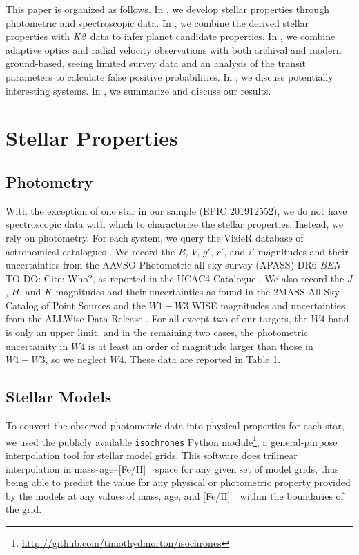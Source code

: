 \documentclass{emulateapj}
\newcommand{\project}[1]{\textsl{#1}}
\newcommand{\KT}{\project{K2}}
\newcommand{\feh}{{[Fe/H]}~}
\newcommand{\todo}[3]{{\color{#2} \emph{#1} TO DO: #3}}
\newcommand{\btmtodo}[1]{\todo{BEN}{red}{#1}}
\begin{document}
This paper is organized as follows.
In , we develop stellar properties through
photometric and spectroscopic data.
In , we combine the derived stellar properties with \KT\ data to infer planet
candidate properties.
In , we combine adaptive optics and radial velocity observations with both
archival and modern ground-based, seeing limited survey data and an analysis of the
transit parameters to calculate false positive probabilities.
In , we discuss potentially interesting systems.
In , we summarize and discuss our results.


\section{Stellar Properties}
\subsection{Photometry}

With the exception of one star in our sample (EPIC 201912552), we do not have
spectroscopic data with which to characterize the stellar properties.
Instead, we rely on photometry.
For each system, we query the VizieR database of astronomical catalogues
\citep{Ochseinbein00}.
We record the $B$, $V$, $g'$, $r'$, and $i'$ magnitudes and their
uncertainties from the AAVSO Photometric all-sky survey (APASS) DR6
\btmtodo{Cite: Who?}, as reported in the UCAC4 Catalogue \citep{Zacharias12}.
We also record the $J$, $H$, and $K$ magnitudes and their uncertainties
as found in the 2MASS All-Sky Catalog of Point Sources \citep{Cutri03}
and the $W1-W3$ WISE magnitudes and uncertainties from the ALLWise Data
Release \citep{Cutri13}.
For all except two of our targets, the $W4$ band is only an upper limit,
and in the remaining two cases, the photometric uncertainity in $W4$ is at least an
order of magnitude larger than those in $W1-W3$, so we neglect $W4$.
These data are reported in Table 1.


\subsection{Stellar Models}
To convert the observed photometric data into physical properties for each
star, we used the publicly available \texttt{isochrones} Python module\footnote{
\url{http://github.com/timothydmorton/isochrones}}, a general-purpose
interpolation tool for stellar model grids.  
This software does trilinear interpolation in mass--age--\feh\ space for any
given set of model grids, thus being able to predict the value for any
physical or photometric property provided by the models at any values of
mass, age, and \feh\ within the boundaries of the grid.  
\end{document}
